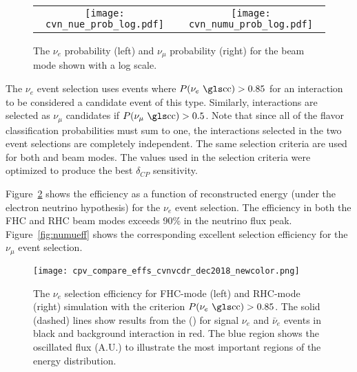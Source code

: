 \begin{figure}
    \centering
    \begin{tabular}{cc}
		\texttt{[image: cvn\_nue\_prob\_log.pdf]} &
		\texttt{[image: cvn\_numu\_prob\_log.pdf]} 
	\end{tabular}
	\caption{The  $\nu_e$  probability (left) and $\nu_\mu$  probability (right) for the  beam mode shown with a log scale.}
    \label{fig:cvnprob}
\end{figure}

The $\nu_e$  event selection uses events where $P(\nu_e \textrm{ \dword{cc}}) > 0.85$ for an interaction to be considered a candidate event of this type. Similarly, interactions are selected as $\nu_\mu$  candidates if $P(\nu_\mu \textrm{ \dword{cc}}) > 0.5$. Note that since all of the flavor classification probabilities must sum to one, the interactions selected in the two event selections are completely independent. The same selection criteria are used for both  and  beam modes. The values used in the selection criteria were optimized to produce the best $\delta_{CP}$ sensitivity.

Figure~\ref{fig:nueeff} shows the efficiency as a function of reconstructed energy (under the electron neutrino hypothesis) for the $\nu_e$ event selection. The efficiency in both the FHC and RHC beam modes exceeds 90\% in the neutrino flux peak. %
Figure~\ref{fig:numueff} shows the corresponding excellent selection efficiency for the $\nu_\mu$ event selection.

\begin{figure}
    \centering
		\texttt{[image: cpv\_compare\_effs\_cvnvcdr\_dec2018\_newcolor.png]} %
	\caption{The $\nu_e$  selection efficiency for FHC-mode (left) and RHC-mode (right) simulation with the criterion $P(\nu_e \textrm{ \dword{cc}}) > 0.85$. The solid (dashed) lines show results from the  () for signal $\nu_e$  and $\bar{\nu}_e$  events in black and  background interaction in red. The blue region shows the oscillated flux (A.U.) to illustrate the most important regions of the energy distribution.}
    \label{fig:nueeff}
\end{figure}

